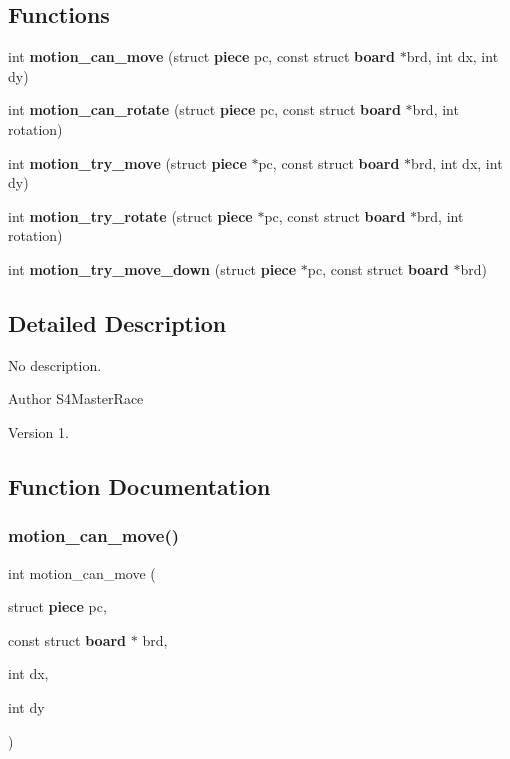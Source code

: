 \subsection*{Functions}
\begin{DoxyCompactItemize}
\item 
int \textbf{ motion\+\_\+can\+\_\+move} (struct \textbf{ piece} pc, const struct \textbf{ board} $\ast$brd, int dx, int dy)
\item 
int \textbf{ motion\+\_\+can\+\_\+rotate} (struct \textbf{ piece} pc, const struct \textbf{ board} $\ast$brd, int rotation)
\item 
int \textbf{ motion\+\_\+try\+\_\+move} (struct \textbf{ piece} $\ast$pc, const struct \textbf{ board} $\ast$brd, int dx, int dy)
\item 
int \textbf{ motion\+\_\+try\+\_\+rotate} (struct \textbf{ piece} $\ast$pc, const struct \textbf{ board} $\ast$brd, int rotation)
\item 
int \textbf{ motion\+\_\+try\+\_\+move\+\_\+down} (struct \textbf{ piece} $\ast$pc, const struct \textbf{ board} $\ast$brd)
\end{DoxyCompactItemize}


\subsection{Detailed Description}
No description. 

\begin{DoxyAuthor}{Author}
S4\+Master\+Race 
\end{DoxyAuthor}
\begin{DoxyVersion}{Version}
1. 
\end{DoxyVersion}


\subsection{Function Documentation}
\mbox{\label{motion_8h_a44d62ec0304b3efce7d5d76f597fed22}} 
\subsubsection{motion\+\_\+can\+\_\+move()}
{\footnotesize\ttfamily int motion\+\_\+can\+\_\+move (\begin{DoxyParamCaption}\item[{struct \textbf{ piece}}]{pc,  }\item[{const struct \textbf{ board} $\ast$}]{brd,  }\item[{int}]{dx,  }\item[{int}]{dy }\end{DoxyParamCaption})}


